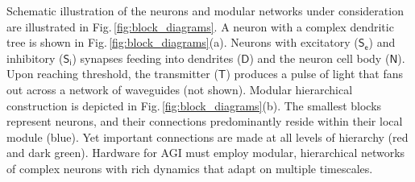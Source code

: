 \documentclass[twocolumn]{article}
\begin{document}
Schematic illustration of the neurons and modular networks under consideration are illustrated in Fig.\,\ref{fig:block_diagrams}. A neuron with a complex dendritic tree is shown in Fig.\,\ref{fig:block_diagrams}(a). Neurons with excitatory ($\mathsf{S_e}$) and inhibitory ($\mathsf{S_i}$) synapses feeding into dendrites ($\mathsf{D}$) and the neuron cell body ($\mathsf{N}$). Upon reaching threshold, the transmitter ($\mathsf{T}$) produces a pulse of light that fans out across a network of waveguides (not shown). Modular hierarchical construction is depicted in Fig.\,\ref{fig:block_diagrams}(b). The smallest blocks represent neurons, and their connections predominantly reside within their local module (blue). Yet important connections are made at all levels of hierarchy (red and dark green). Hardware for AGI must employ modular, hierarchical networks of complex neurons with rich dynamics that adapt on multiple timescales.
\begin{figure}[t!]
\end{figure}
\end{document}
